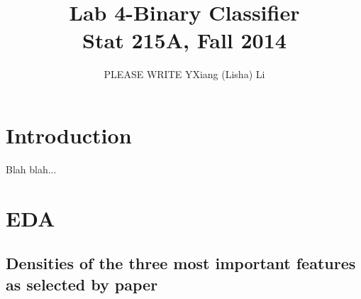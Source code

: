 \documentclass{article}\usepackage[]{graphicx}\usepackage[]{color}
\begin{document}
\title{Lab 4-Binary Classifier\\
Stat 215A, Fall 2014}

\author{PLEASE WRITE YXiang (Lisha) Li}

\maketitle


\section{Introduction}
Blah blah...

\section{EDA}
\subsection{Densities of the three most important features as selected by paper}
\end{document}
